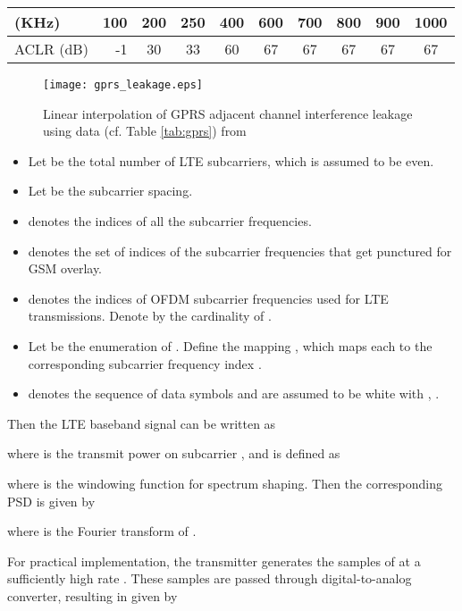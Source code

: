 \documentclass[10pt,journal]{IEEEtran}
\theoremstyle{slplain}
\begin{document}
\begin{table*}
\centering
\begin{tabular}{|l|r*{8}{c}|} \hline
(KHz)              & 100 & 200 & 250 & 400 & 600  & 700 & 800 & 900 & 1000  \\
\hline
ACLR (dB)  & -1  & 30  & 33 & 60  & 67  & 67 & 67  & 67  & 67   \\
\hline
\end{tabular}
\caption{GSM adjacent channel interference leakage specifications \cite{ETSIgsm}}
\label{tab:gprs}
\end{table*}




\begin{figure}
\centering
\texttt{[image: gprs\_leakage.eps]}
\caption{Linear interpolation of GPRS adjacent channel interference leakage using data (cf. Table \ref{tab:gprs}) from \cite{ETSIgsm}}
\label{fig:gprs}
\end{figure}




\begin{itemize}
\item Let  be the total number of LTE subcarriers, which is assumed to be even.
\item Let  be the subcarrier spacing.
\item  denotes the indices of all the subcarrier frequencies.
\item  denotes the set of indices of the subcarrier frequencies that get punctured for GSM overlay.
\item  denotes the indices of OFDM subcarrier frequencies used for LTE transmissions. Denote by  the cardinality of .
\item Let  be the enumeration of . Define the mapping , which maps each  to the corresponding subcarrier frequency index .
\item  denotes the sequence of data symbols and are assumed to be white with , .
\end{itemize}
Then the LTE baseband signal  can be written as

where  is the transmit power on subcarrier ,  and  is defined as

where  is the windowing function for spectrum shaping.  Then the corresponding PSD is given by

where  is the Fourier transform of .


For practical implementation, the transmitter generates the samples of  at a sufficiently high rate . These samples are passed through digital-to-analog converter, resulting in  given by
\end{document}
